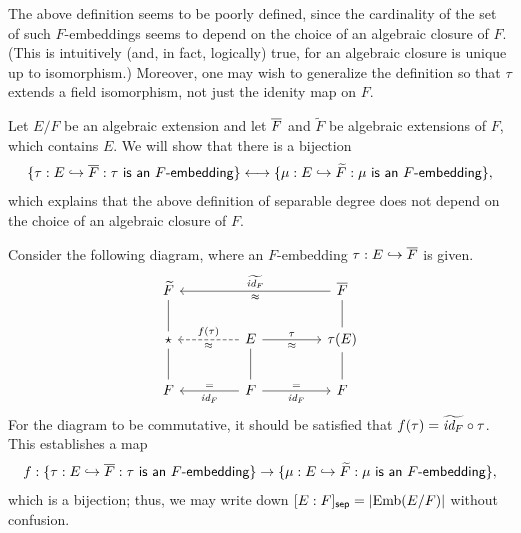 The above definition seems to be poorly defined, since the cardinality of the set of such $F$-embeddings seems to depend on the choice of an algebraic closure of $F$. (This is intuitively (and, in fact, logically) true, for an algebraic closure is unique up to isomorphism.)
Moreover, one may wish to generalize the definition so that $\tau$ extends a field isomorphism, not just the idenity map on $F$.
\begin{obs}
    Let $E/F$ be an algebraic extension and let $\overline{F}$ and $\widetilde F$ be algebraic extensions of $F$, which contains $E$.
    We will show that there is a bijection
    \begin{align*}
        \{\tau: E\hookrightarrow\overline{F}: \textsf{$\tau$ is an $F$-embedding}\}
        \longleftrightarrow
        \{\mu: E\hookrightarrow\widetilde F: \textsf{$\mu$ is an $F$-embedding}\},
    \end{align*}
    which explains that the above definition of separable degree does not depend on the choice of an algebraic closure of $F$.

    Consider the following diagram, where an $F$-embedding $\tau: E\hookrightarrow\overline{F}$ is given.
    \begin{equation*}
    \begin{tikzcd}[row sep=0.7cm, column sep=1.5cm]
        \widetilde F
        &
        &
        \ol F
            \arrow[ll, "\widetilde{\id{F}}"', "\approx"]
        \\
        \star
            \arrow[u, dash]
        &
        E
            \arrow[l, "f(\tau)"', "\approx", dashed]
            \arrow[r, "\tau", "\approx"']
        &
        \tau(E)
            \arrow[u, dash]
        \\
        F
            \arrow[u, dash]
        &
        F
            \arrow[l, "\id{F}", "="']
            \arrow[u, dash]
            \arrow[r, "\id{F}"', "="]
        &
        F
            \arrow[u, dash]
    \end{tikzcd}
    \end{equation*}
    For the diagram to be commutative, it should be satisfied that $f(\tau)=\widetilde{\textit{id}_{F}}\circ\tau$.
    This establishes a map
    \begin{align*}
        f:
        \{\tau: E\hookrightarrow\overline{F}: \textsf{$\tau$ is an $F$-embedding}\}
        \rightarrow
        \{\mu: E\hookrightarrow\widetilde F: \textsf{$\mu$ is an $F$-embedding}\},
    \end{align*}
    \color{brown}which is a bijection\color{black}; thus, we may write down $[E: F]_{\textsf{sep}}=|{\textrm{Emb}({E/F})}|$ without confusion.
\end{obs}
